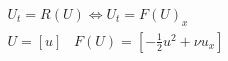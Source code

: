 \documentclass[10pt]{article} %
\begin{document}
\color{fgC}\[\begin{matrix}
  U_t = R(U)  \Leftrightarrow U_t = F(U)_x \\
  U = [u]\;\;\;
  F(U) = [-\frac{1}{2}u^2+\nu u_x]
\end{matrix}\]
\end{document}
